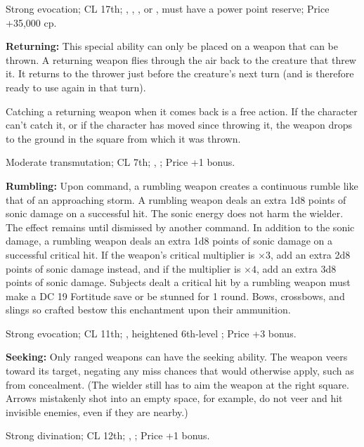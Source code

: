 Strong evocation; CL 17th; , , ,  or , must have a power point reserve; Price +35,000 cp.


\textbf{Returning:} This special ability can only be placed on a weapon that can be thrown. A returning weapon flies through the air back to the creature that threw it. It returns to the thrower just before the creature's next turn (and is therefore ready to use again in that turn).

Catching a returning weapon when it comes back is a free action. If the character can't catch it, or if the character has moved since throwing it, the weapon drops to the ground in the square from which it was thrown.

Moderate transmutation; CL 7th; , ; Price +1 bonus.


\textbf{Rumbling:} Upon command, a rumbling weapon creates a continuous rumble like that of an approaching storm. A rumbling weapon deals an extra 1d8 points of sonic damage on a successful hit. The sonic energy does not harm the wielder. The effect remains until dismissed by another command. In addition to the sonic damage, a rumbling weapon deals an extra 1d8 points of sonic damage on a successful critical hit. If the weapon's critical multiplier is $\times3$, add an extra 2d8 points of sonic damage instead, and if the multiplier is $\times4$, add an extra 3d8 points of sonic damage. Subjects dealt a critical hit by a rumbling weapon must make a DC 19 Fortitude save or be stunned for 1 round. Bows, crossbows, and slings so crafted bestow this enchantment upon their ammunition.

Strong evocation; CL 11th; , heightened 6th-level ; Price +3 bonus.


\textbf{Seeking:} Only ranged weapons can have the seeking ability. The weapon veers toward its target, negating any miss chances that would otherwise apply, such as from concealment. (The wielder still has to aim the weapon at the right square. Arrows mistakenly shot into an empty space, for example, do not veer and hit invisible enemies, even if they are nearby.)

Strong divination; CL 12th; , ; Price +1 bonus.


